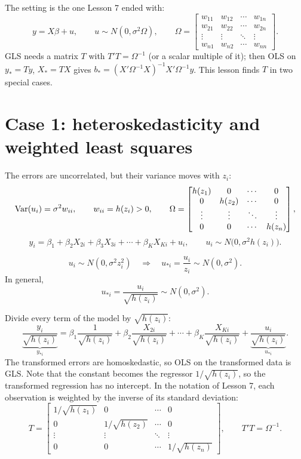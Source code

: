 \documentclass[11pt]{article}
\begin{document}

The setting is the one Lesson 7 ended with:
\[ y = X\beta + u, \qquad u \sim N(0, \sigma^{2}\Omega), \qquad
   \Omega = \begin{bmatrix}
     w_{11} & w_{12} & \cdots & w_{1n}\\
     w_{21} & w_{22} & \cdots & w_{2n}\\
     \vdots & \vdots & \ddots & \vdots\\
     w_{n1} & w_{n2} & \cdots & w_{nn}
   \end{bmatrix}. \]
GLS needs a matrix $T$ with $T'T = \Omega^{-1}$ (or a scalar multiple of it); then
OLS on $y_{*} = Ty$, $X_{*} = TX$ gives $b_{*} = (X'\Omega^{-1}X)^{-1}X'\Omega^{-1}y$.
This lesson finds $T$ in two special cases.


\section{Case 1: heteroskedasticity and weighted least squares}

The errors are uncorrelated, but their variance moves with $z_{i}$:
\[ \operatorname{Var}(u_{i}) = \sigma^{2}w_{ii}, \qquad w_{ii} = h(z_{i}) > 0, \qquad
   \Omega = \begin{bmatrix}
     h(z_{1}) & 0 & \cdots & 0\\
     0 & h(z_{2}) & \cdots & 0\\
     \vdots & \vdots & \ddots & \vdots\\
     0 & 0 & \cdots & h(z_{n})
   \end{bmatrix}, \]
\[ y_{i} = \beta_{1} + \beta_{2}X_{2i} + \beta_{3}X_{3i} + \cdots + \beta_{K}X_{Ki} + u_{i},
   \qquad u_{i} \sim N\bigl(0, \sigma^{2}h(z_{i})\bigr). \]

\[ u_{i} \sim N(0, \sigma^{2}z_{i}^{2})
   \quad\Longrightarrow\quad
   u_{*i} = \frac{u_{i}}{z_{i}} \sim N(0, \sigma^{2}). \]
In general,
\[ u_{*i} = \frac{u_{i}}{\sqrt{h(z_{i})}} \sim N(0, \sigma^{2}). \]

Divide every term of the model by $\sqrt{h(z_{i})}$:
\[ \underbrace{\frac{y_{i}}{\sqrt{h(z_{i})}}}_{y_{*i}}
   = \beta_{1}\frac{1}{\sqrt{h(z_{i})}}
     + \beta_{2}\frac{X_{2i}}{\sqrt{h(z_{i})}}
     + \cdots
     + \beta_{K}\frac{X_{Ki}}{\sqrt{h(z_{i})}}
     + \underbrace{\frac{u_{i}}{\sqrt{h(z_{i})}}}_{u_{*i}}. \]
The transformed errors are homoskedastic, so OLS on the transformed data is GLS.
Note that the constant becomes the regressor $1/\sqrt{h(z_{i})}$, so the transformed
regression has no intercept. In the notation of Lesson 7, each observation is
weighted by the inverse of its standard deviation:
\[ T = \begin{bmatrix}
     1/\sqrt{h(z_{1})} & 0 & \cdots & 0\\
     0 & 1/\sqrt{h(z_{2})} & \cdots & 0\\
     \vdots & \vdots & \ddots & \vdots\\
     0 & 0 & \cdots & 1/\sqrt{h(z_{n})}
   \end{bmatrix}, \qquad T'T = \Omega^{-1}. \]
\end{document}
